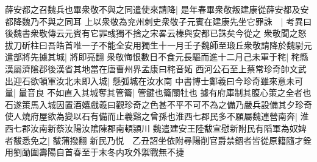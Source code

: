 薛安都之召魏兵也畢衆敬不與之同遣使來請降|{
	是年春畢衆敬叛建康從薛安都及安都降魏乃不與之同耳}
上以衆敬為兖州刺史衆敬子元賓在建康先坐它罪誅　|{
	考異曰後魏書衆敬傳云元賓有它罪彧獨不捨之宋畧云榛與安都已誅矣今從之}
衆敬聞之怒拔刀斫柱曰吾皓首唯一子不能全安用獨生十一月壬子魏師至瑖丘衆敬請降於魏尉元遣部將先據其城|{
	將即亮翻}
衆敬悔恨數日不食元長驅而進十二月己未軍于秺|{
	秺縣漢屬濟隂郡後漢省其地當在唐曹州界孟康曰秺音妬}
西河公石至上蔡常珍奇帥文武出迎石欲頓軍汝北未即入城|{
	懸弧城在汝水南}
中書博士鄭羲曰今珍奇雖來意未可量|{
	量音良}
不如直入其城奪其管籥|{
	管鍵也籥關牡也}
據有府庫制其腹心策之全者也石遂策馬入城因置酒嬉戲羲曰觀珍奇之色甚不平不可不為之備乃嚴兵設備其夕珍奇使人燒府屋欲為變以石有備而止羲谿之曾孫也淮西七郡民多不願屬魏連營南奔|{
	淮西七郡汝南新蔡汝陽汝隂陳郡南頓潁川}
魏遣建安王陸馛宣慰新附民有䧟軍為奴婢者馛悉免之|{
	馛蒲撥翻}
新民乃悦　乙丑詔坐依附尋陽削官爵禁錮者皆從原籍隨才銓用劉勔圍壽陽自首春至于末冬内攻外禦戰無不捷

